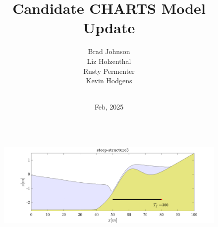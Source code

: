 \documentclass[aspectratio=169]{beamer}
\title[CHARTS]{Candidate CHARTS Model Update} %
\author[]{Brad Johnson\\Liz Holzenthal\\Rusty Permenter \\Kevin Hodgens } %
\institute[ERDC] %
{USACE Engineering Research and Devlelopment Center \\ %
\medskip
\textit{} %
}
\date{\vspace*{-0cm}\\ Feb, 2025} %
\begin{document}
\begin{frame}
  \begin{columns}[c] %
    
    \titlepage %
    \begin{figure}
            \includegraphics[width=1\linewidth]{./present.png}
    \end{figure}
    
  \end{columns}
\end{frame}
\end{document}
